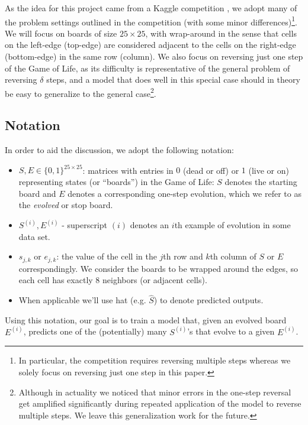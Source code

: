 \documentclass[conference]{IEEEtran}
\begin{document}
As the idea for this project came from a Kaggle competition \cite{b1}, we adopt many of the problem settings outlined in the competition (with some minor differences)\footnote{In particular, the competition requires reversing multiple steps whereas we solely focus on reversing just one step in this paper.}. \label{wraparoundboard} We will focus on boards of size $25 \times 25$, with wrap-around in the sense that cells on the left-edge (top-edge) are considered adjacent to the cells on the right-edge (bottom-edge) in the same row (column). We also focus on reversing just one step of the Game of Life, as its difficulty is representative of the general problem of reversing $\delta$ steps, and a model that does well in this special case should in theory be easy to generalize to the general case\footnote{Although in actuality we noticed that minor errors in the one-step reversal get amplified significantly during repeated application of the model to reverse multiple steps. We leave this generalization work for the future.}.

\subsection{Notation}
In order to aid the discussion, we adopt the following notation:

\begin{itemize}
    \item $S, E \in \{0, 1\}^{25\times 25}$: matrices with entries in $0$ (dead or off) or $1$ (live or on) representing states (or ``boards'') in the Game of Life: $S$ denotes the starting board and $E$ denotes a corresponding one-step evolution, which we refer to as the \emph{evolved} or stop board.
    \item $S^{(i)}, E^{(i)}$ - superscript $(i)$ denotes an $i$th example of evolution in some data set.
    \item $s_{j,k}$ or $e_{j,k}$: the value of the cell in the $j$th row and $k$th column of $S$ or $E$ correspondingly. We consider the boards to be wrapped around the edges, so each cell has exactly 8 neighbors (or adjacent cells).
    \item When applicable we'll use hat (e.g. $\hat S$) to denote predicted outputs.
\end{itemize}

Using this notation, our goal is to train a model that, given an evolved board $E^{(i)}$, predicts one of the (potentially) many $S^{(i)}$'s that evolve to a given $E^{(i)}$.
\end{document}
